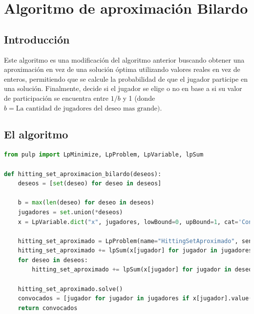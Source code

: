 \documentclass{estilo}
\begin{document}
\newpage

\section{Algoritmo de aproximación Bilardo}

\subsection{Introducción}

Este algoritmo es una modificación del algoritmo anterior buscando obtener una aproximación en vez de una solución óptima utilizando valores reales en vez de enteros, permitiendo que se calcule la probabilidad de que el jugador participe en una solución. Finalmente, decide si el jugador se elige o no en base a si su valor de participación se encuentra entre $1/b$  y 1 (donde $b = \text{La cantidad de jugadores del deseo mas grande)}$.

\subsection{El algoritmo}

\begin{lstlisting}[language=Python]
from pulp import LpMinimize, LpProblem, LpVariable, lpSum

def hitting_set_aproximacion_bilardo(deseos):
    deseos = [set(deseo) for deseo in deseos]
    
    b = max(len(deseo) for deseo in deseos)
    jugadores = set.union(*deseos)
    x = LpVariable.dict("x", jugadores, lowBound=0, upBound=1, cat='Continuous')
    
    hitting_set_aproximado = LpProblem(name="HittingSetAproximado", sense=LpMinimize)
    hitting_set_aproximado += lpSum(x[jugador] for jugador in jugadores)
    for deseo in deseos:
        hitting_set_aproximado += lpSum(x[jugador] for jugador in deseo) >= 1
        
    hitting_set_aproximado.solve()
    convocados = [jugador for jugador in jugadores if x[jugador].value() >= 1/b]
    return convocados
\end{lstlisting}

\end{document}
